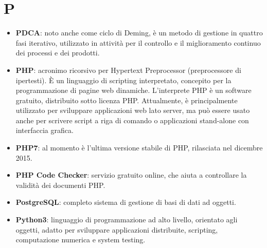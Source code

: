 \newpage
\section{P}

\begin{itemize}
	\item \textbf{PDCA}: noto anche come ciclo di Deming, è un metodo di gestione in quattro fasi iterativo, utilizzato in attività per il controllo e il miglioramento continuo dei processi e dei prodotti.
	\item \textbf{PHP}: acronimo ricorsivo per Hypertext Preprocessor (preprocessore di ipertesti). \MakeUppercase{è} un linguaggio di scripting interpretato, concepito per la programmazione di pagine web dinamiche. L'interprete PHP è un software gratuito, distribuito sotto licenza PHP. Attualmente, è principalmente utilizzato per sviluppare applicazioni web lato server, ma può essere usato anche per scrivere script a riga di comando o applicazioni stand-alone con interfaccia grafica.
	\item \textbf{PHP7}: al momento è l'ultima versione stabile di PHP, rilasciata nel dicembre 2015.
	\item \textbf{PHP Code Checker}: servizio gratuito online, che aiuta a controllare la validità dei documenti PHP.
	\item \textbf{PostgreSQL}: completo sistema di gestione di basi di dati ad oggetti.
	\item \textbf{Python3}: linguaggio di programmazione ad alto livello, orientato agli oggetti, adatto per sviluppare applicazioni distribuite, scripting, computazione numerica e system testing.
\end{itemize}


